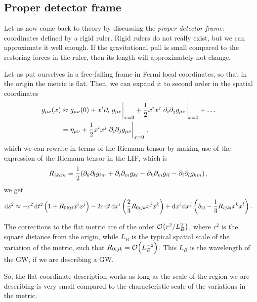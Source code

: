 \documentclass[main.tex]{subfiles}
\begin{document}
\subsection{Proper detector frame}

Let us now come back to theory by discussing the \emph{proper detector frame}: coordinates defined by a rigid ruler. 
Rigid rulers do not really exist, but we can approximate it well enough. If the gravitational pull is small compared to the restoring forces in the ruler, then its length will approximately not change. 

Let us put ourselves in a free-falling frame in Fermi local coordinates, so that in the origin the metric is flat.
Then, we can expand it to second order in the spatial coordinates 
%
\begin{subequations}
\begin{align}
g_{\mu \nu } (x) &\approx g_{\mu \nu } (0)
+ x^{i} \partial_{i} \eval{g_{\mu \nu }}_{x=0} 
+ \frac{1}{2} x^{i} x^{j} \eval{\partial_{i} \partial_{j} g_{\mu \nu }}_{x=0} + \dots  \\
&= \eta_{\mu \nu } + \frac{1}{2} x^{i} x^{j} \eval{\partial_{i} \partial_{j} g_{\mu \nu }}_{x=0}
\,,
\end{align}
\end{subequations}
%
which we can rewrite in terms of the Riemann tensor by making use of the expression of the Riemann tensor in the LIF, which is 
%
\begin{align} \label{eq:riemann-tensor-LIF}
R_{iklm} = \frac{1}{2} \qty(
  \partial_{k} \partial_{l} g_{im} +
  \partial_{i} \partial_{m} g_{kl} -
  \partial_{k} \partial_{m} g_{il} -
  \partial_{i} \partial_{l} g_{km}  
)
\,,
\end{align}
%
we get 
%
\begin{align}
\dd{s^2} \approx - c^2 \dd{t^2} \qty(1 + R_{0i0j} x^{i}x^{j})
-2 c \dd{t} \dd{x^{i}} \qty(\frac{2}{3}R_{0ijk} x^{j}x^{k})
+ \dd{x^{i}} \dd{x^{j}} \qty(\delta_{ij} - \frac{1}{3} R_{ijkl} x^{k} x^{l})
\,.
\end{align}

The corrections to the flat metric are of the order \(\order{r^2 / L_B^2}\), where \(r^2\) is the square distance from the origin, while \(L_B\) is the typical spatial scale of the variation of the metric, such that \(R_{0ijk} = \order{L_B^{-2}}\). 
This \(L_B\) is the wavelength of the GW, if we are describing a GW.

So, the flat coordinate description works as long as the scale of the region we are describing is very small compared to the characteristic scale of the variations in the metric. 
\end{document}
